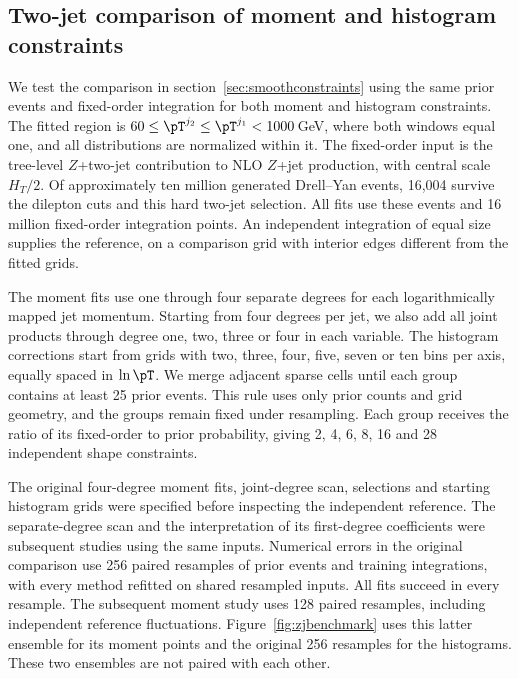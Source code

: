 \subsection{Two-jet comparison of moment and histogram constraints}
\label{sec:zjbenchmark}

We test the comparison in section~\ref{sec:smoothconstraints} using the same prior events and fixed-order integration for both moment and histogram constraints. The fitted region is $60\le\pT^{j_2}\le\pT^{j_1}<1000\,$GeV, where both windows equal one, and all distributions are normalized within it. The fixed-order input is the tree-level $Z$+two-jet contribution to NLO $Z$+jet production, with central scale $H_T/2$. Of approximately ten million generated Drell--Yan events, 16,004 survive the dilepton cuts and this hard two-jet selection. All fits use these events and 16 million fixed-order integration points. An independent integration of equal size supplies the reference, on a comparison grid with interior edges different from the fitted grids.

The moment fits use one through four separate degrees for each logarithmically mapped jet momentum. Starting from four degrees per jet, we also add all joint products through degree one, two, three or four in each variable. The histogram corrections start from grids with two, three, four, five, seven or ten bins per axis, equally spaced in $\ln\pT$. We merge adjacent sparse cells until each group contains at least 25 prior events. This rule uses only prior counts and grid geometry, and the groups remain fixed under resampling. Each group receives the ratio of its fixed-order to prior probability, giving 2, 4, 6, 8, 16 and 28 independent shape constraints.

The original four-degree moment fits, joint-degree scan, selections and starting histogram grids were specified before inspecting the independent reference. The separate-degree scan and the interpretation of its first-degree coefficients were subsequent studies using the same inputs. Numerical errors in the original comparison use 256 paired resamples of prior events and training integrations, with every method refitted on shared resampled inputs. All fits succeed in every resample. The subsequent moment study uses 128 paired resamples, including independent reference fluctuations. Figure~\ref{fig:zjbenchmark} uses this latter ensemble for its moment points and the original 256 resamples for the histograms. These two ensembles are not paired with each other.

